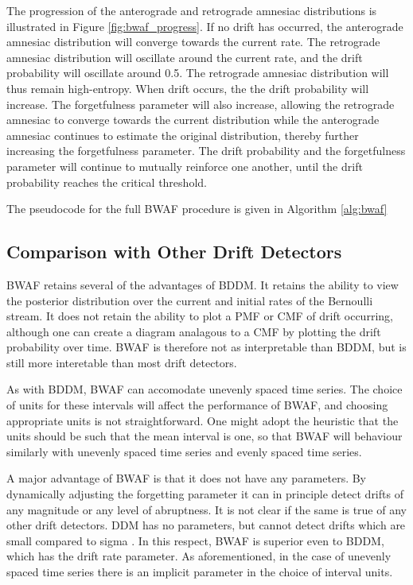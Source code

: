 The progression of the anterograde and retrograde amnesiac distributions is illustrated in Figure \ref{fig:bwaf_progress}. If no drift has occurred, the anterograde amnesiac distribution will converge towards the current rate. The retrograde amnesiac distribution will oscillate around the current rate, and the drift probability will oscillate around 0.5. The retrograde amnesiac distribution will thus remain high-entropy. When drift occurs, the the drift probability will increase. The forgetfulness parameter will also increase, allowing the retrograde amnesiac to converge towards the current distribution while the anterograde amnesiac continues to estimate the original distribution, thereby further increasing the forgetfulness parameter. The drift probability and the forgetfulness parameter will continue to mutually reinforce one another, until the drift probability reaches the critical threshold. 

The pseudocode for the full BWAF procedure is given in Algorithm \ref{alg:bwaf}

\subsection{Comparison with Other Drift Detectors}

BWAF retains several of the advantages of BDDM. It retains the ability to view the posterior distribution over the current and initial rates of the Bernoulli stream. It does not retain the ability to plot a PMF or CMF of drift occurring, although one can create a diagram analagous to a CMF by plotting the drift probability over time. BWAF is therefore not as interpretable than BDDM, but is still more interetable than most drift detectors. 

As with BDDM, BWAF can accomodate unevenly spaced time series. The choice of units for these intervals will affect the performance of BWAF, and choosing appropriate units is not straightforward. One might adopt the heuristic that the units should be such that the mean interval is one, so that BWAF will behaviour similarly with unevenly spaced time series and evenly spaced time series. 

A major advantage of BWAF is that it does not have any parameters. By dynamically adjusting the forgetting parameter it can in principle detect drifts of any magnitude or any level of abruptness. It is not clear if the same is true of any other drift detectors. DDM has no parameters, but cannot detect drifts which are small compared to sigma \cite{DDM}. In this respect, BWAF is superior even to BDDM, which has the drift rate parameter. As aforementioned, in the case of unevenly spaced time series there is an implicit parameter in the choice of interval units. %

